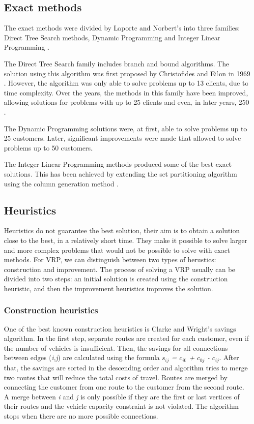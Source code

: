 \documentclass[a4paper,twoside,12pt]{book}
\begin{document}
\subsection{Exact methods}
The exact methods were divided by Laporte and Norbert's into three families: Direct Tree Search methods, Dynamic Programming and Integer Linear Programming \cite{bib:chapter:ExactMethods}.

The Direct Tree Search family includes branch and bound algorithms. The solution using this algorithm was first proposed by Christofides and Eilon in 1969 \cite{bib:article:Eilon}. However, the algorithm was only able to solve problems up to 13 clients, due to time complexity. Over the years, the methods in this family have been improved, allowing solutions for problems with up to 25 \cite{bib:article:LowerBound} clients and even, in later years, 250 \cite{bib:article:Laporte}.

The Dynamic Programming solutions were, at first, able to solve problems up to 25 customers. Later, significant improvements were made that allowed to solve problems up to 50 customers.

The Integer Linear Programming methods produced some of the best exact solutions. This has been achieved by extending the set partitioning algorithm using the column generation method \cite{bib:article:ILP}. 

\subsection{Heuristics}
Heuristics do not guarantee the best solution, their aim is to obtain a solution close to the best, in a relatively short time. They make it possible to solve larger and more complex problems that would not be possible to solve with exact methods. For VRP, we can distinguish between two types of herustics: construction and improvement. The process of solving a VRP usually can be divided into two steps: an initial solution is created using the construction heuristic, and then the improvement heuristics improves the solution. 
\subsubsection{Construction heuristics}
One of the best known construction heuristics is Clarke and Wright's savings algorithm. In the first step, separate routes are created for each customer, even if the number of vehicles is insufficient. Then, the  savings for all connections between edges (\textit{i,j}) are calculated using the formula \textit{$s_{ij}$ = $c_{i0}$ + $c_{0j}$ - $c_{ij}$}. After that, the savings are sorted in the descending order and algorithm tries to merge two routes that will reduce the total costs of travel. Routes are merged by connecting the customer from one route to the customer from the second route. A merge between \textit{i} and \textit{j} is only possible if they are the first or last vertices of their routes and the vehicle capacity constraint is not violated. The algorithm stops when there are no more possible connections.
\end{document}
